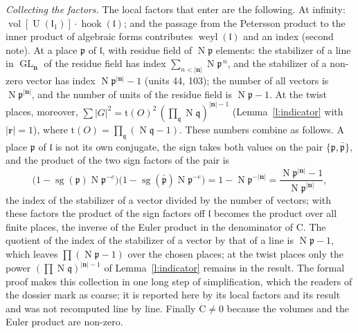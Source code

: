 \documentclass[11pt,a4paper]{article}
\makeatletter
\theoremstyle{plainx}
\theoremstyle{uprightx}
\renewenvironment{proof}[1][Proof]{\par\pushQED{\qed}\normalfont\topsep0pt\partopsep0pt
  \trivlist\item[\hskip\labelsep\itshape #1.]\ignorespaces}{\popQED\endtrivlist\@endpefalse}
\newcommand{\bn}{\mathbf{n}}
\newcommand{\br}{\mathbf{r}}
\newcommand{\sI}{\mathsf{I}}
\newcommand{\fp}{\mathfrak{p}}
\newcommand{\fa}{O}
\newcommand{\fl}{\mathfrak{l}}
\newcommand{\rC}{\mathrm{C}}
\newcommand{\GL}{\operatorname{GL}}
\newcommand{\U}{\operatorname{U}}
\newcommand{\Np}{\operatorname{N}}
\makeatother
\begin{document}
\begin{proof}[Proof of Theorem 5]
\emph{Collecting the factors.} The local factors that enter are the following. At infinity:
$\operatorname{vol}[\U(\sI_1)]\cdot\operatorname{hook}(\fl)$; and the passage from the Petersson product to the inner
product of algebraic forms contributes $\operatorname{weyl}(\fl)$ and an index (second note). At a place $\fp$ of
$\fl$, with residue field of $\Np\fp$ elements: the stabilizer of a line in $\GL_{\bn}$ of the residue field has
index $\sum_{n<|\bn|}\Np\fp^{\,n}$, and the stabilizer of a non-zero vector has index $\Np\fp^{|\bn|}-1$ (units 44,
103); the number of all vectors is $\Np\fp^{|\bn|}$, and the number of units of the residue field is $\Np\fp-1$.
At the twist places, moreover, $\sum|G|^2=\mathrm{t}(\fa)^2\,(\prod_{\mathfrak{q}}\Np\mathfrak{q})^{|\bn|-1}$
(Lemma~\ref{l:indicator} with $|\br|=1$), where $\mathrm{t}(\fa)=\prod_{\mathfrak{q}}(\Np\mathfrak{q}-1)$. These numbers
combine as follows. A place $\fp$ of $\fl$ is not its own conjugate, the sign takes both values on the pair
$\{\fp,\bar{\fp}\}$, and the product of the two sign factors of the pair is
\[\bigl(1-\operatorname{sg}(\fp)\Np\fp^{-e}\bigr)\bigl(1-\operatorname{sg}(\bar{\fp})\Np\fp^{-e}\bigr)=1-\Np\fp^{-|\bn|}
=\frac{\Np\fp^{|\bn|}-1}{\Np\fp^{|\bn|}},\]
the index of the stabilizer of a vector divided by the number of vectors; with these factors the product of the
sign factors off $\fl$ becomes the product over all finite places, the inverse of the Euler product in the
denominator of $\rC$. The quotient of the index of the stabilizer of a vector by that of a line is $\Np\fp-1$,
which leaves $\prod(\Np\fp-1)$ over the chosen places; at the twist places only the power
$(\prod\Np\mathfrak{q})^{|\bn|-1}$ of Lemma~\ref{l:indicator} remains in the result. The formal proof makes this collection in one long step of
simplification, which the readers of the dossier mark as coarse; it is reported here by its local factors and its
result and was not recomputed line by line. Finally $\rC\ne0$ because the volumes and the Euler product are
non-zero.
\end{proof}
\end{document}
